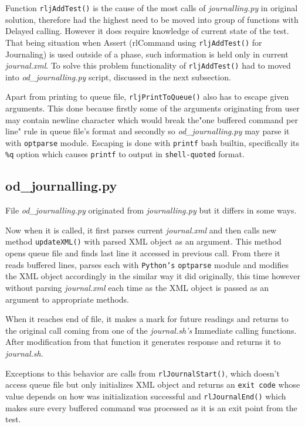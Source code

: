 Function \texttt{rljAddTest()} is the cause of the most calls of \textit{journalling.py} in original solution, therefore had the highest need to be moved into group of functions with Delayed calling. However it does require knowledge of current state of the test. That being situation when Assert (rlCommand using \texttt{rljAddTest()} for Journaling) is used outside of a phase, such information is held only in current \textit{journal.xml}. To solve this problem functionality of  \texttt{rljAddTest()} had to moved into \textit{{od\_journalling.py}} script, discussed in the next subsection.

Apart from printing to queue file, \texttt{rljPrintToQueue()} also has to escape given arguments. This done because firstly some of the arguments originating from user may contain newline character which would break the"one buffered command per line" rule in  queue file's format and secondly so \textit{od\_journalling.py} may parse it with \texttt{optparse} module.
Escaping is done with \texttt{printf} bash builtin\cite{bash_builtins}, specifically its \texttt{\%q} option which causes \texttt{printf} to output in \texttt{shell-quoted} format.

\subsection{od\_journalling.py}
File \textit{od\_journalling.py} originated from \textit{journalling.py} but it differs in some ways.

Now when it is called, it first parses current \textit{journal.xml} and then calls new method \texttt{updateXML()} with parsed XML object as an argument. This method opens queue file and finds last line it accessed in previous call. From there it reads buffered lines, parses each with \texttt{Python's} \texttt{optparse} module and modifies the XML object accordingly in the similar way it did originally, this time however without parsing \textit{journal.xml} each time as the XML object is passed as an argument to appropriate methods. 

When it reaches end of file, it makes a mark for future readings and returns to the original call coming from one of the \textit{journal.sh's}  Immediate calling functions. After modification from that function it generates response and returns it to \textit{journal.sh}. 

Exceptions to this behavior are calls  from \texttt{rlJournalStart()}, which doesn't access queue file but only initializes XML object and returns an \texttt{exit code} whose value depends on how was initialization successful and \texttt{rlJournalEnd()} which makes sure every buffered command was processed as it is an exit point from the test.


